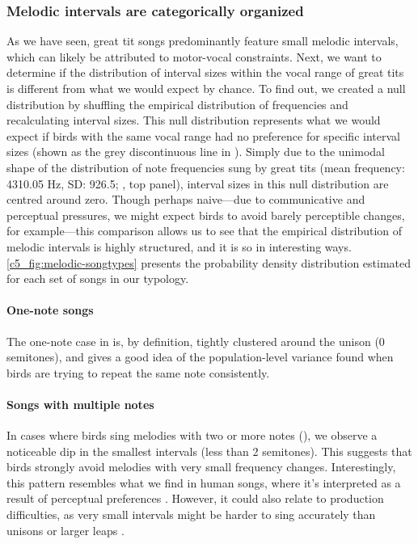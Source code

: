 \subsubsection{Melodic intervals are categorically organized}
As we have seen, great tit songs predominantly feature small melodic intervals, which can likely be attributed to motor-vocal constraints. Next, we want to determine if the distribution of interval sizes within the vocal range of great tits is different from what we would expect by chance. To find out, we created a null distribution by shuffling the empirical distribution of frequencies and recalculating interval sizes. This null distribution represents what we would expect if birds with the same vocal range had no preference for specific interval sizes (shown as the grey discontinuous line in ). Simply due to the unimodal shape of the distribution of note frequencies sung by great tits (mean frequency: 4310.05 Hz, SD: 926.5; , top panel), interval sizes in this null distribution are centred around zero. Though perhaps naive---due to communicative and perceptual pressures, we might expect birds to avoid barely perceptible changes, for example---this comparison allows us to see that the empirical distribution of melodic intervals is highly structured, and it is so in interesting ways. \autoref{c5_fig:melodic-songtypes} presents the probability density distribution estimated for each set of songs in our typology.

\paragraph{One-note songs} 
The one-note case in  is, by definition, tightly clustered around the unison (0 semitones), and gives a good idea of the population-level variance found when birds are trying to repeat the same note consistently.

\paragraph{Songs with multiple notes}
In cases where birds sing melodies with two or more notes (), we observe a noticeable dip in the smallest intervals (less than 2 semitones). This suggests that birds strongly avoid melodies with very small frequency changes. Interestingly, this pattern resembles what we find in human songs, where it's interpreted as a result of perceptual preferences \autocite{bowling2012, kuroyanagi2019}. However, it could also relate to production difficulties, as very small intervals might be harder to sing accurately than unisons or larger leaps \autocite{anglada-tort2023}.


